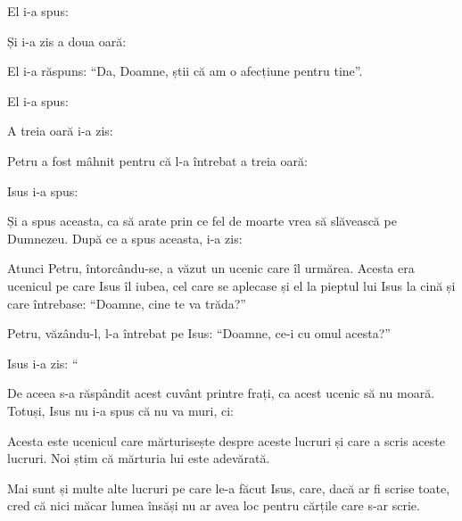 {\par }{\PP El i-a spus:
{}

Și i-a zis a doua oară:
{}

\par }{\PP El i-a răspuns: “Da, Doamne, știi că am o afecțiune pentru tine”.

\par }{\PP El i-a spus:
{}

A treia oară i-a zis:
{}

\par }{\PP Petru a fost mâhnit pentru că l-a întrebat a treia oară:
{}

\par }{\PP Isus i-a spus:
{}



\par }{\PP {}Și a spus aceasta, ca să arate prin ce fel de moarte vrea să slăvească pe Dumnezeu. După ce a spus aceasta, i-a zis:
{}


\par }{\PP {}Atunci Petru, întorcându-se, a văzut un ucenic care îl urmărea. Acesta era ucenicul pe care Isus îl iubea, cel care se aplecase și el la pieptul lui Isus la cină și care întrebase: “Doamne, cine te va trăda?”

Petru, văzându-l, l-a întrebat pe Isus: “Doamne, ce-i cu omul acesta?”


\par }{\PP {}Isus i-a zis: “{}

De aceea s-a răspândit acest cuvânt printre frați, ca acest ucenic să nu moară. Totuși, Isus nu i-a spus că nu va muri, ci:
{}


\par }{\PP {}Acesta este ucenicul care mărturisește despre aceste lucruri și care a scris aceste lucruri. Noi știm că mărturia lui este adevărată.

Mai sunt și multe alte lucruri pe care le-a făcut Isus, care, dacă ar fi scrise toate, cred că nici măcar lumea însăși nu ar avea loc pentru cărțile care s-ar scrie.


\par }